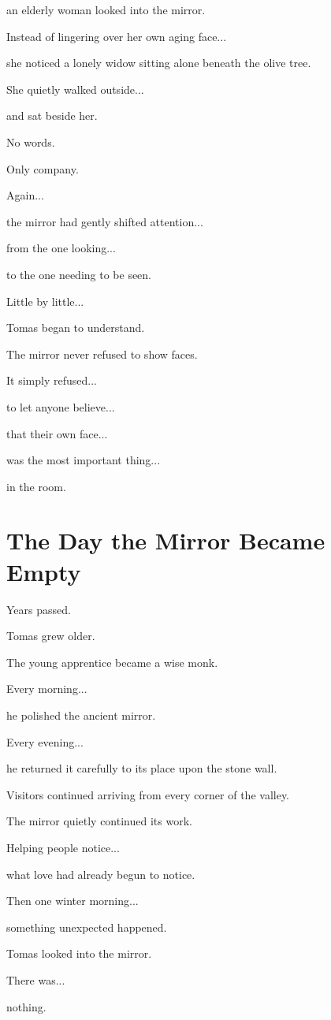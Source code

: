 \documentclass[12pt,openany]{book}
\begin{document}
an elderly woman looked into the mirror.

Instead of lingering over her own aging face...

she noticed a lonely widow sitting alone beneath the olive tree.

She quietly walked outside...

and sat beside her.

No words.

Only company.

Again...

the mirror had gently shifted attention...

from the one looking...

to the one needing to be seen.

Little by little...

Tomas began to understand.

The mirror never refused to show faces.

It simply refused...

to let anyone believe...

that their own face...

was the most important thing...

in the room.
\section*{The Day the Mirror Became Empty}

Years passed.

Tomas grew older.

The young apprentice became a wise monk.

Every morning...

he polished the ancient mirror.

Every evening...

he returned it carefully to its place upon the stone wall.

Visitors continued arriving from every corner of the valley.

The mirror quietly continued its work.

Helping people notice...

what love had already begun to notice.

Then one winter morning...

something unexpected happened.

Tomas looked into the mirror.

There was...

nothing.
\end{document}
